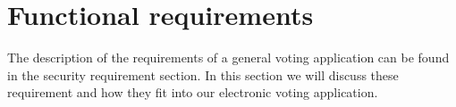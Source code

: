 \section{Functional requirements}
The description of the requirements of a general voting application can be found in the security requirement section. In this section we will discuss these requirement and how they fit into our electronic voting application.